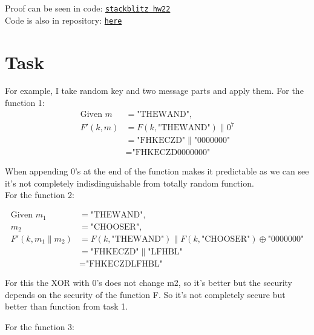 \documentclass{article}
\begin{document}
Proof can be seen in code: \href{https://stackblitz.com/edit/js-ekqepc?devtoolsheight=80&file=hw22.js&hideDevTools=false}{\texttt{stackblitz hw22}}\\
Code is also in repository: \href{https://github.com/Nurech/js-ekqepc}{\texttt{here}}

\section{Task}%

For example, I take random key and two message parts and apply them.
For the function 1:
\begin{align*}
  \text{Given } m &= \text{"THEWAND"}, \\
  F'(k, m) &= F(k, \text{"THEWAND"}) \parallel 0^7 \\
  &= \text{"FHKECZD"} \parallel \text{"0000000"} \\
  &= \text{"FHKECZD0000000"}
\end{align*}

When appending 0's at the end of the function makes it predictable as we can see it's not completely indisdinguishable from totally
random function.\\

For the function 2:

\begin{align*}
  \text{Given } m_1 &= \text{"THEWAND"}, \\
  m_2 &= \text{"CHOOSER"}, \\
  F'(k, m_1 \parallel m_2) &= F(k, \text{"THEWAND"}) \parallel F(k, \text{"CHOOSER"}) \oplus \text{"0000000"} \\
  &= \text{"FHKECZD"} \parallel \text{"LFHBL"} \\
  &= \text{"FHKECZDLFHBL"}
\end{align*}

For this the XOR with 0's does not change m2, so it's better but the security depends on the security of the function F.
So it's not completely secure but better than function from task 1.

For the function 3:
\end{document}
